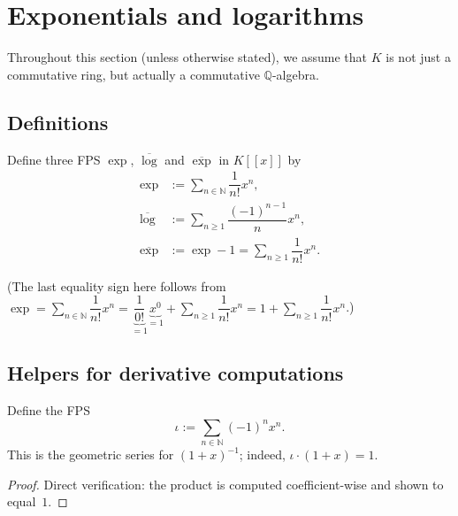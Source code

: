 \section{Exponentials and logarithms}

\begin{convention}
\label{conv.fps.exp.K-Q-alg}Throughout this section (unless otherwise stated), we assume
that $K$ is not just a commutative ring, but actually a commutative
$\mathbb{Q}$-algebra.
\end{convention}

\subsection{Definitions}

\begin{definition}
\label{def.fps.exp-log}
\leantarget
\leanok
Define three FPS $\exp$, $\overline{\log}$ and
$\overline{\exp}$ in $K\left[\left[x\right]\right]$ by
\begin{align*}
\exp &  :=\sum_{n\in\mathbb{N}}\dfrac{1}{n!}x^{n},\\
\overline{\log}  &  :=\sum_{n\geq1}\dfrac{\left(-1\right)^{n-1}}{n}x^{n},\\
\overline{\exp}  &  :=\exp-1=\sum_{n\geq1}\dfrac{1}{n!}x^{n}.
\end{align*}

(The last equality sign here follows from $\exp=\sum_{n\in\mathbb{N}}\dfrac
{1}{n!}x^{n}=\underbrace{\dfrac{1}{0!}}_{=1}\underbrace{x^{0}}_{=1}
+\sum_{n\geq1}\dfrac{1}{n!}x^{n}=1+\sum_{n\geq1}\dfrac{1}{n!}x^{n}$.)
\end{definition}

\subsection{Helpers for derivative computations}

\begin{lemma}
\label{lem.fps.invOnePlusX}
\leanhelper
\leanok
Define the FPS
\[
\iota := \sum_{n \in \mathbb{N}} (-1)^n x^n.
\]
This is the geometric series for $(1+x)^{-1}$; indeed, $\iota \cdot (1+x) = 1$.
\end{lemma}

\begin{proof}
Direct verification: the product is computed coefficient-wise and shown to equal~$1$.
\end{proof}

